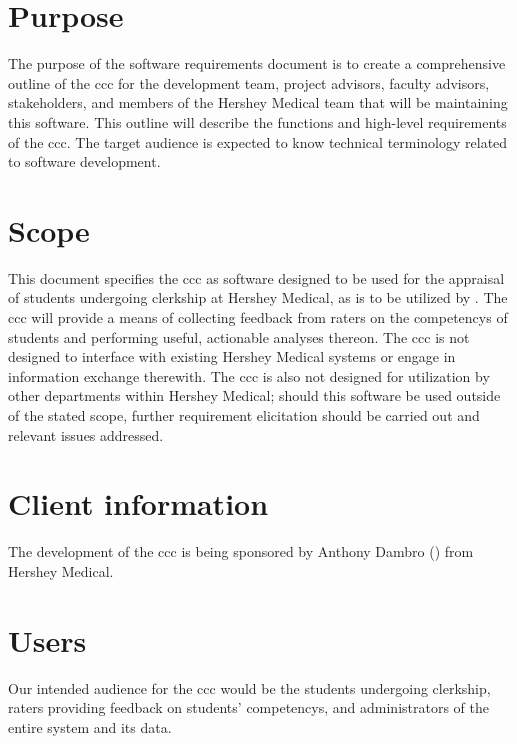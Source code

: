 \documentclass[letterpaper,article,oneside]{memoir}
\begin{document}
\section{Purpose}

The purpose of the software requirements document is to create a comprehensive outline of the \gls{ccc} for the development team, project advisors, faculty advisors, stakeholders, and members of the Hershey Medical team that will be maintaining this software.
This outline will describe the functions and high-level requirements of the \gls{ccc}.
The target audience is expected to know technical terminology related to software development.

\section{Scope}

This document specifies the \gls{ccc} as software designed to be used for the appraisal of \glspl{student} undergoing clerkship at Hershey Medical, as is to be utilized by .
The \gls{ccc} will provide a means of collecting feedback from \glspl{rater} on the \glspl{competency} of \glspl{student} and performing useful, actionable analyses thereon.
The \gls{ccc} is not designed to interface with existing Hershey Medical systems or engage in information exchange therewith.
The \gls{ccc} is also not designed for utilization by other departments within Hershey Medical; should this software be used outside of the stated scope, further requirement elicitation should be carried out and relevant issues addressed.

\section{Client information}

The development of the \gls{ccc} is being sponsored by Anthony Dambro () from Hershey Medical. 

\section{Users}

Our intended audience for the \gls{ccc} would be the \glspl{student} undergoing clerkship, \glspl{rater} providing feedback on \glspl{student}' \glspl{competency}, and administrators of the entire system and its data.
\end{document}
